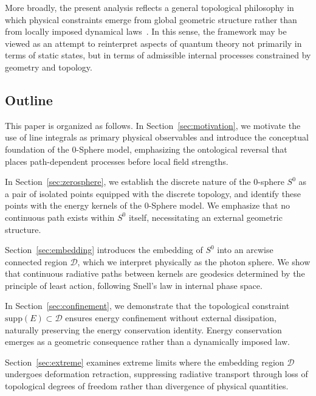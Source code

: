 \documentclass[%
 reprint,
 amsmath,amssymb,
 aps,
 prb,
]{revtex4-2}
\numberwithin{equation}{section}
\begin{document}
More broadly, the present analysis reflects a general topological philosophy in which physical constraints emerge from global geometric structure rather than from locally imposed dynamical laws~\cite{Geroch1970,Frankel2011}.
In this sense, the framework may be viewed as an attempt to reinterpret aspects of quantum theory not primarily in terms of static states, but in terms of admissible internal processes constrained by geometry and topology.

\clearpage

\subsection*{Outline}

This paper is organized as follows.
In Section~\ref{sec:motivation}, we motivate the use of line integrals as primary physical observables and introduce the conceptual foundation of the 0-Sphere model, emphasizing the ontological reversal that places path-dependent processes before local field strengths.

In Section~\ref{sec:zerosphere}, we establish the discrete nature of the 0-sphere $S^0$ as a pair of isolated points equipped with the discrete topology, and identify these points with the energy kernels of the 0-Sphere model. We emphasize that no continuous path exists within $S^0$ itself, necessitating an external geometric structure.

Section~\ref{sec:embedding} introduces the embedding of $S^0$ into an arcwise connected region $\mathcal{D}$, which we interpret physically as the photon sphere. We show that continuous radiative paths between kernels are geodesics determined by the principle of least action, following Snell's law in internal phase space.

In Section~\ref{sec:confinement}, we demonstrate that the topological constraint $\mathrm{supp}(E) \subset \mathcal{D}$ ensures energy confinement without external dissipation, naturally preserving the energy conservation identity. Energy conservation emerges as a geometric consequence rather than a dynamically imposed law.

Section~\ref{sec:extreme} examines extreme limits where the embedding region $\mathcal{D}$ undergoes deformation retraction, suppressing radiative transport through loss of topological degrees of freedom rather than divergence of physical quantities.
\end{document}
